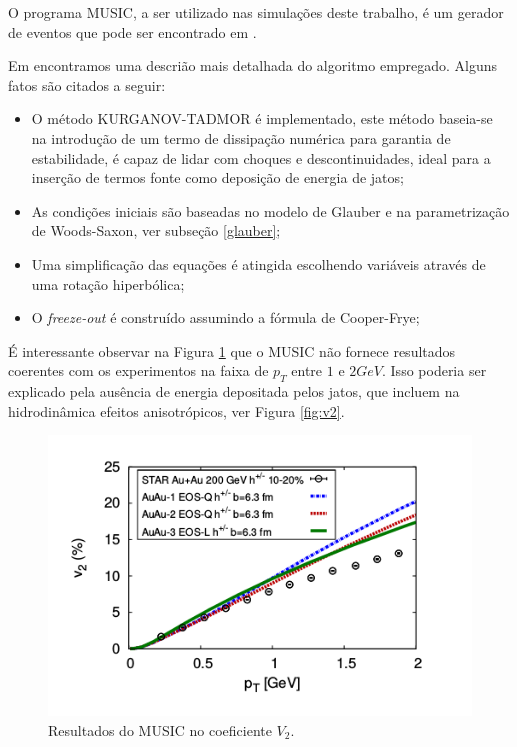 O programa MUSIC, a ser utilizado nas simulações deste trabalho, é um
gerador de eventos que pode ser encontrado em \cite{noauthor_music_nodate}.
\par
Em \cite{schenke_3+1d_2010} encontramos uma descrião mais detalhada do algoritmo empregado. Alguns fatos
são citados a seguir:

\begin{itemize}
 \item O método KURGANOV-TADMOR é implementado, este método baseia-se na introdução de
 um termo de dissipação numérica para garantia de estabilidade, é capaz de lidar com
 choques e descontinuidades, ideal para a inserção de termos fonte como deposição de energia
 de jatos;
 \item As condições iniciais são baseadas no modelo de Glauber e na parametrização de Woods-Saxon,
 ver subseção \ref{glauber};
 \item Uma simplificação das equações é atingida escolhendo variáveis através de uma rotação hiperbólica;
 \item O {\it freeze-out} é construído assumindo a fórmula de Cooper-Frye\cite{teaney_chemical_2002};
\end{itemize}

É interessante observar na Figura \ref{fig:musicv2} que o MUSIC não fornece resultados coerentes com os experimentos na faixa de $p_T$
entre $1$ e $2 GeV$. Isso poderia ser explicado pela ausência de energia depositada pelos jatos, que incluem na hidrodinâmica efeitos
anisotrópicos\cite{andrade_jet_2014}, ver Figura \ref{fig:v2}.

\begin{figure}[!h]
\centering
 \includegraphics[scale=0.5]{Content/music_results.png}
 \caption{Resultados do MUSIC no coeficiente $V_{2}$.}
 \label{fig:musicv2}
\end{figure}
